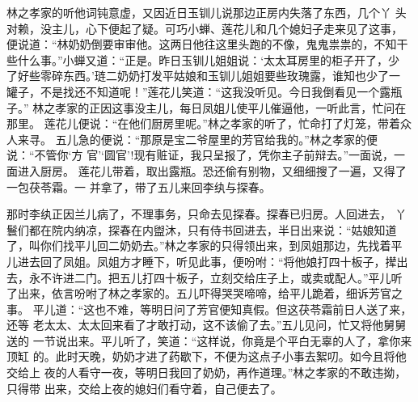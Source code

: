 林之孝家的听他词钝意虚，又因近日玉钏儿说那边正房内失落了东西，几个丫
头对赖，没主儿，心下便起了疑。可巧小蝉、莲花儿和几个媳妇子走来见了这事，
便说道：“林奶奶倒要审审他。这两日他往这里头跑的不像，鬼鬼祟祟的，不知干
些什么事。”小蝉又道：“正是。昨日玉钏儿姐姐说：‘太太耳房里的柜子开了，少
了好些零碎东西。’琏二奶奶打发平姑娘和玉钏儿姐姐要些玫瑰露，谁知也少了一
罐子，不是找还不知道呢！”莲花儿笑道：“这我没听见。今日我倒看见一个露瓶子。”
林之孝家的正因这事没主儿，每日凤姐儿使平儿催逼他，一听此言，忙问在那里。
莲花儿便说：“在他们厨房里呢。”林之孝家的听了，忙命打了灯笼，带着众人来寻。
五儿急的便说：“那原是宝二爷屋里的芳官给我的。”林之孝家的便说：“不管你‘方
官’‘圆官’!现有赃证，我只呈报了，凭你主子前辩去。”一面说，一面进入厨房。
莲花儿带着，取出露瓶。恐还偷有别物，又细细搜了一遍，又得了一包茯苓霜。一
并拿了，带了五儿来回李纨与探春。

那时李纨正因兰儿病了，不理事务，只命去见探春。探春已归房。人回进去，
丫鬟们都在院内纳凉，探春在内盥沐，只有侍书回进去，半日出来说：“姑娘知道
了，叫你们找平儿回二奶奶去。”林之孝家的只得领出来，到凤姐那边，先找着平
儿进去回了凤姐。凤姐方才睡下，听见此事，便吩咐：“将他娘打四十板子，撵出
去，永不许进二门。把五儿打四十板子，立刻交给庄子上，或卖或配人。”平儿听
了出来，依言吩咐了林之孝家的。五儿吓得哭哭啼啼，给平儿跪着，细诉芳官之事。
平儿道：“这也不难，等明日问了芳官便知真假。但这茯苓霜前日人送了来，还等
老太太、太太回来看了才敢打动，这不该偷了去。”五儿见问，忙又将他舅舅送的
一节说出来。平儿听了，笑道：“这样说，你竟是个平白无辜的人了，拿你来顶缸
的。此时天晚，奶奶才进了药歇下，不便为这点子小事去絮叨。如今且将他交给上
夜的人看守一夜，等明日我回了奶奶，再作道理。”林之孝家的不敢违拗，只得带
出来，交给上夜的媳妇们看守着，自己便去了。

